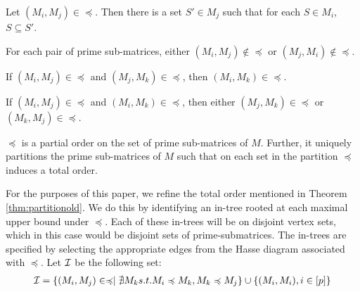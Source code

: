 \documentclass{llncs}
\def\cI{{\cal I}}
\begin{document}
\begin{lemma} \label{lem:containment}
Let $(M_i,M_j) \in \preccurlyeq$.  Then there is a set $S' \in M_j$ such that for each $S \in M_i$, $S \subseteq S'$. 
\end{lemma}
\begin{lemma}
For each pair of prime sub-matrices, either $(M_i,M_j) \not\in \preccurlyeq$ or $(M_j,M_i) \not\in \preccurlyeq$.
\end{lemma}
\begin{lemma}
If $(M_i,M_j) \in \preccurlyeq $ and $(M_j,M_k) \in \preccurlyeq$, then $(M_i,M_k) \in \preccurlyeq$.
\end{lemma}
\begin{lemma} \label{lem:twoparents}
If $(M_i,M_j) \in \preccurlyeq$ and $(M_i,M_k) \in \preccurlyeq$, then
either $(M_j,M_k) \in \preccurlyeq$ or $(M_k,M_j) \in \preccurlyeq$. 
\end{lemma}
\begin{theorem} \label{thm:partitionold}
  $\preccurlyeq$ is a partial order on the set of prime sub-matrices
  of $M$.  Further, it uniquely partitions the prime sub-matrices of
  $M$ such that on each set in the partition $\preccurlyeq$ induces a
  total order.
\end{theorem}
For the purposes of this paper, we refine the total order mentioned in
Theorem \ref{thm:partitionold}. We do this by identifying an in-tree
rooted at each maximal upper bound under $\preccurlyeq$.  Each of
these in-trees will be on disjoint vertex sets, which in this case
would be disjoint sets of prime-submatrices.  The in-trees are
specified by selecting the appropriate edges from the Hasse diagram
associated with $\preccurlyeq$.  Let $\cI$ be the following set:
\begin{align*}
  \cI = \{ (M_i,M_j) \in \preccurlyeq \mid \nexists M_k s.t. M_i \preccurlyeq M_k, M_k \preccurlyeq M_j
  \} \cup \{ (M_i,M_i), i \in [p] \}
\end{align*}
\end{document}
